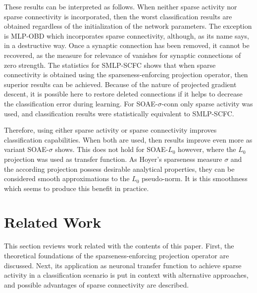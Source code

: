 \documentclass[twoside,11pt]{article}
\newcommand{\0}{\mathcal{O}}
\begin{document}
These results can be interpreted as follows.
When neither sparse activity nor sparse connectivity is incorporated, then the worst classification results are obtained regardless of the initialization of the network parameters.
The exception is MLP-OBD which incorporates sparse connectivity, although, as its name says, in a destructive way.
Once a synaptic connection has been removed, it cannot be recovered, as the measure for relevance of \citet{LeCun1990} vanishes for synaptic connections of zero strength.
The statistics for SMLP-SCFC shows that when sparse connectivity is obtained using the sparseness-enforcing projection operator, then superior results can be achieved.
Because of the nature of projected gradient descent, it is possible here to restore deleted connections if it helps to decrease the classification error during learning.
For SOAE-$\sigma$-conn only sparse activity was used, and classification results were statistically equivalent to SMLP-SCFC.

Therefore, using either sparse activity or sparse connectivity improves classification capabilities.
When both are used, then results improve even more as variant SOAE-$\sigma$ shows.
This does not hold for SOAE-$L_0$ however, where the $L_0$ projection was used as transfer function.
As Hoyer's sparseness measure $\sigma$ and the according projection possess desirable analytical properties, they can be considered smooth approximations to the $L_0$ pseudo-norm.
It is this smoothness which seems to produce this benefit in practice.

\section{Related Work}
This section reviews work related with the contents of this paper.
First, the theoretical foundations of the sparseness-enforcing projection operator are discussed.
Next, its application as neuronal transfer function to achieve sparse activity in a classification scenario is put in context with alternative approaches, and possible advantages of sparse connectivity are described.
\end{document}

